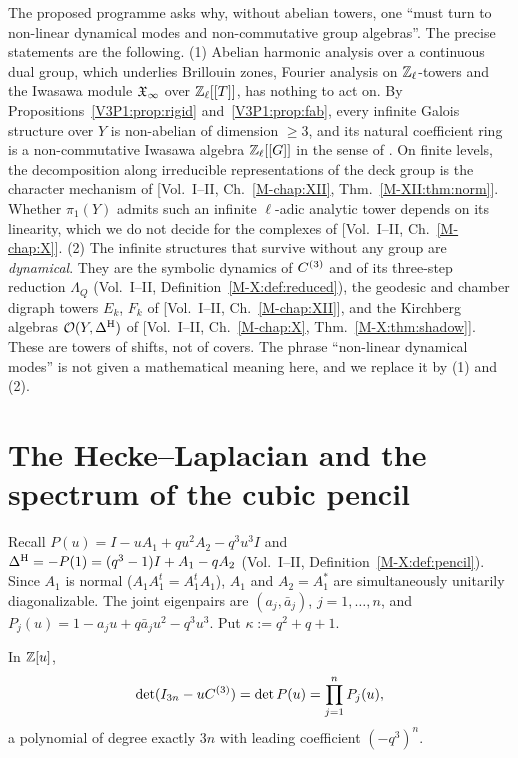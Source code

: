 \begin{remark}\label{V3P1:rem:turn}
The proposed programme asks why, without abelian towers, one ``must turn to non-linear dynamical
modes and non-commutative group algebras''. The precise statements are the following.
(1) Abelian harmonic analysis over a continuous dual group, which underlies Brillouin zones,
Fourier analysis on $\mathbb{Z}_\ell$-towers and the Iwasawa module $\mathfrak{X}_\infty$ over $\mathbb{Z}_\ell[[T]]$, has
nothing to act on. By Propositions~\ref{V3P1:prop:rigid} and~\ref{V3P1:prop:fab}, every
infinite Galois structure over $Y$ is non-abelian of dimension $\ge3$, and its natural
coefficient ring is a non-commutative Iwasawa algebra $\mathbb{Z}_\ell[[G]]$ in the sense of
\cite{CFKSV}. On finite levels, the decomposition along irreducible representations of the
deck group is the character mechanism of [Vol.~I--II, Ch.~\ref{M-chap:XII}, Thm.~\ref{M-XII:thm:norm}].
Whether $\pi_1(Y)$ admits such an infinite $\ell$-adic analytic tower depends on its
linearity, which we do not decide for the complexes of [Vol.~I--II, Ch.~\ref{M-chap:X}].
(2) The infinite structures that survive without any group are \emph{dynamical}. They are the
symbolic dynamics of $C^{(3)}$ and of its three-step reduction $\Lambda_Q$
(Vol.~I--II, Definition~\ref{M-X:def:reduced}), the geodesic and chamber digraph towers $E_k$, $F_k$ of
[Vol.~I--II, Ch.~\ref{M-chap:XII}], and the Kirchberg algebras $\mathcal{O}(Y,\Delta^{\mathrm{H}})$ of
[Vol.~I--II, Ch.~\ref{M-chap:X}, Thm.~\ref{M-X:thm:shadow}]. These are towers of shifts, not of covers. The
phrase ``non-linear dynamical modes'' is not given a mathematical meaning here, and we
replace it by (1) and (2).
\end{remark}

\section{The Hecke--Laplacian and the spectrum of the cubic pencil}\label{V3P1:sec:pencil}

Recall $P(u)=I-uA_1+qu^{2}A_2-q^{3}u^{3}I$ and $\Delta^{\mathrm{H}}=-P(1)=(q^{3}-1)I+A_1-qA_2$
(Vol.~I--II, Definition~\ref{M-X:def:pencil}). Since $A_1$ is normal ($A_1A_1^{t}=A_1^{t}A_1$), $A_1$ and
$A_2=A_1^{*}$ are simultaneously unitarily diagonalizable. The joint eigenpairs are
$(a_j,\bar a_j)$, $j=1,\dots,n$, and $P_j(u)=1-a_ju+q\bar a_ju^{2}-q^{3}u^{3}$. Put
$\kappa:=q^{2}+q+1$.

\begin{theorem}\label{V3P1:thm:det}
In $\mathbb{Z}[u]$,
\[
\det(I_{3n}-uC^{(3)})=\det P(u)=\prod_{j=1}^{n}P_j(u),
\]
a polynomial of degree exactly $3n$ with leading coefficient $(-q^{3})^{n}$.
\end{theorem}

